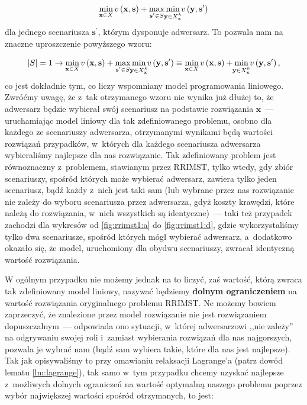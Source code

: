 \begin{equation}
	\min_{\mathclap{\textbf{x} \in X}} v \left( \textbf{x}, \textbf{s} \right) + \max_{\mathclap{\textbf{s}^{\prime} \in S}} \min_{\mathclap{\textbf{y} \in X^{k}_{\textbf{x}}}} v \left( \textbf{y}, \textbf{s}^{\prime} \right)
\end{equation}
dla jednego scenariusza $\textbf{s}^{\prime}$, którym dysponuje adwersarz.
To pozwala nam na znaczne uproszczenie powyższego wzoru:

\begin{equation}
	 \left| S \right| = 1 \rightarrow \min_{\mathclap{\textbf{x} \in X}} v \left( \textbf{x}, \textbf{s} \right) + \max_{\mathclap{\textbf{s}^{\prime} \in S}} \min_{\mathclap{\textbf{y} \in X^{k}_{\textbf{x}}}} v \left( \textbf{y}, \textbf{s}^{\prime} \right) \equiv \min_{\mathclap{\textbf{x} \in X}} v \left( \textbf{x}, \textbf{s} \right) + \min_{\mathclap{\textbf{y} \in X^{k}_{\textbf{x}}}} v \left( \textbf{y}, \textbf{s}^{\prime} \right)\text{,}
\end{equation}
co jest dokładnie tym, co liczy wspomniany model programowania liniowego.
Zwróćmy uwagę, że z~tak otrzymanego wzoru nie wynika już dłużej to, że adwersarz będzie wybierał swój scenariusz na podstawie rozwiązania $\textbf{x}$~--- uruchamiając model liniowy dla tak zdefiniowanego problemu, osobno dla każdego ze scenariuszy adwersarza, otrzymanymi wynikami będą wartości rozwiązań przypadków, w~których dla każdego scenariusza adwersarza wybieraliśmy najlepsze dla nas rozwiązanie.
Tak zdefiniowany problem jest równoznaczny z~problemem, stawianym przez \textsc{RRIMST}, tylko wtedy, gdy zbiór scenariuszy, spośród których może wybierać adwersarz, zawiera tylko jeden scenariusz, bądź każdy z~nich jest taki sam (lub wybrane przez nas rozwiązanie nie zależy do wyboru scenariusza przez adwersarza, gdyż koszty krawędzi, które należą do rozwiązania, w~nich wszystkich są identyczne)~--- taki też przypadek zachodzi dla wykresów od \ref{fig:rrimst1:a} do \ref{fig:rrimst1:d}, gdzie wykorzystaliśmy tylko dwa scenariusze, spośród których mógł wybierać adwersarz, a~dodatkowo okazało się, że model, uruchomiony dla obydwu scenariuszy, zwracał identyczną wartość rozwiązania.

W ogólnym przypadku nie możemy jednak na to liczyć, zaś wartość, którą zwraca tak zdefiniowany model liniowy, nazywać będziemy \textbf{dolnym ograniczeniem} na wartość rozwiązania oryginalnego problemu \textsc{RRIMST}.
Ne możemy bowiem zaprzeczyć, że znalezione przez model rozwiązanie nie jest rozwiązaniem dopuszczalnym~--- odpowiada ono sytuacji, w~której adwersarzowi ,,nie zależy'' na odgrywaniu swojej roli i~zamiast wybierania rozwiązań dla nas najgorszych, pozwala je wybrać nam (bądź sam wybiera takie, które dla nas jest najlepsze).
Tak jak opisywaliśmy to przy omawianiu relaksacji Lagrange'a (patrz dowód lematu \ref{lm:lagrange}), tak samo w~tym przypadku chcemy uzyskać najlepsze z~możliwych dolnych ograniczeń na wartość optymalną naszego problemu poprzez wybór największej wartości spośród otrzymanych, to jest:

